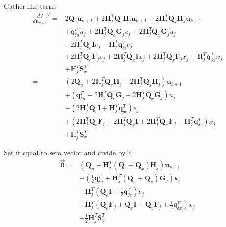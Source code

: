 \documentclass[landscape]{article}
\begin{document}
Gather like terms
\begin{align}
\frac{dJ}{d\mathbf{u}_{k+1} }^T 
=&2 
    \mathbf{Q}_u                              \mathbf{u}_{k+1}
+ 2 \mathbf{H}_j^T \mathbf{Q}_e  \mathbf{H}_j \mathbf{u}_{k+1}
+ 2 \mathbf{H}_j^T \mathbf{Q}_x\mathbf{H}_j   \mathbf{u}_{k+1}\\
&
+   \mathbf{q}_{\delta u}^T                   u_j 
+ 2 \mathbf{H}_j^T \mathbf{Q}_e  \mathbf{G}_j u_j 
+ 2 \mathbf{H}_j^T \mathbf{Q}_x\mathbf{G}_j   u_j \\
&
- 2 \mathbf{H}_j^T \mathbf{Q}_e  \mathbf{I}   e_j 
-   \mathbf{H}_j^T \mathbf{q}_{\delta e}^T    e_j \\
&
+ 2 \mathbf{H}_j^T \mathbf{Q}_e  \mathbf{F}_j x_j
+ 2 \mathbf{H}_j^T \mathbf{Q}_x\mathbf{I}     x_j 
+ 2 \mathbf{H}_j^T \mathbf{Q}_x\mathbf{F}_j   x_j 
+   \mathbf{H}_j^T \mathbf{q}_{\delta x}^T    x_j\\
&
+   \mathbf{H}_j^T \mathbf{S}_x^T\\
=&
\left(
2 \mathbf{Q}_u                              
+ 2 \mathbf{H}_j^T \mathbf{Q}_e  \mathbf{H}_j 
+ 2 \mathbf{H}_j^T \mathbf{Q}_x\mathbf{H}_j   
\right)\mathbf{u}_{k+1}\\
&
+\left(
    \mathbf{q}_{\delta u}^T                    
+ 2 \mathbf{H}_j^T \mathbf{Q}_e  \mathbf{G}_j  
+ 2 \mathbf{H}_j^T \mathbf{Q}_x\mathbf{G}_j   
\right) u_j\\
&
-\left(
  2 \mathbf{H}_j^T \mathbf{Q}_e  \mathbf{I}
+   \mathbf{H}_j^T \mathbf{q}_{\delta e}^T    
\right) e_j \\
&
+ \left(
  2 \mathbf{H}_j^T \mathbf{Q}_e  \mathbf{F}_j 
+ 2 \mathbf{H}_j^T \mathbf{Q}_x\mathbf{I}      
+ 2 \mathbf{H}_j^T \mathbf{Q}_x\mathbf{F}_j    
+   \mathbf{H}_j^T \mathbf{q}_{\delta x}^T    
\right) x_j \\
&
+   \mathbf{H}_j^T \mathbf{S}_x^T
\end{align}

Set it equal to zero vector and divide by 2
\begin{align}
\vec{0}
=&
\left(
   \mathbf{Q}_u                              
+  \mathbf{H}_j^T (\mathbf{Q}_e + \mathbf{Q}_x)  \mathbf{H}_j 
\right)\mathbf{u}_{k+1}\\
&
+\left(
  \frac{1}{2} \mathbf{q}_{\delta u}^T                    
+ \mathbf{H}_j^T (\mathbf{Q}_e + \mathbf{Q}_x)  \mathbf{G}_j  
\right) u_j\\
&
-\mathbf{H}_j^T\left(
    \mathbf{Q}_e  \mathbf{I}
+  \frac{1}{2} \mathbf{q}_{\delta e}^T    
\right) e_j \\
&
+ \mathbf{H}_j^T\left(
    \mathbf{Q}_e  \mathbf{F}_j 
+   \mathbf{Q}_x  \mathbf{I}      
+   \mathbf{Q}_x  \mathbf{F}_j    
+  \frac{1}{2} \mathbf{q}_{\delta x}^T    
\right) x_j \\
&
+  \frac{1}{2} \mathbf{H}_j^T \mathbf{S}_x^T
\end{align}
\end{document}
